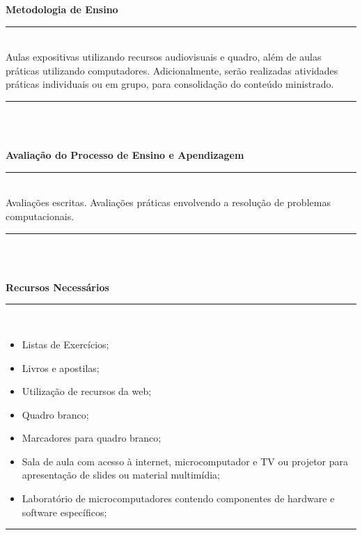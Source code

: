 \vspace{-12mm}
\begin{center}\textbf{Metodologia de Ensino}\end{center} 
\vspace{-5mm}
\noindent\rule{16.5cm}{0.4pt}
\\
   Aulas expositivas utilizando recursos audiovisuais e quadro, além de aulas práticas utilizando computadores. Adicionalmente, serão realizadas atividades práticas individuais ou em grupo, para consolidação do conteúdo ministrado.\\
\noindent\rule{16.5cm}{0.4pt}\\
\\
\vspace{-12mm}
\begin{center}\textbf{Avaliação do Processo de Ensino e Apendizagem}\end{center}
\vspace{-5mm}
\noindent\rule{16.5cm}{0.4pt}
\\
   Avaliações escritas. Avalia\c{c}\~oes pr\'aticas envolvendo a resolu\c{c}\~ao de problemas computacionais.\\
\noindent\rule{16.5cm}{0.4pt}\\
\\
\vspace{-12mm}
\begin{center}\textbf{Recursos Necessários}\end{center}
\vspace{-5mm}
\noindent\rule{16.5cm}{0.4pt}
\\
\begin{itemize} 
  \item Listas de Exercícios;
  \item Livros e apostilas;
  \item Utilização de recursos da web;
  \item Quadro branco;
  \item Marcadores para quadro branco;
  \item Sala de aula com acesso à internet, microcomputador e TV ou projetor para apresentação de slides ou material multimídia;
  \item Laboratório de microcomputadores contendo componentes de hardware e software específicos;
\end{itemize}
\noindent\rule{16.5cm}{0.4pt}\\
\\
